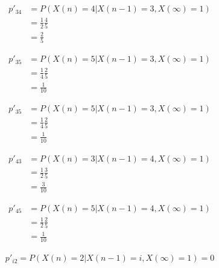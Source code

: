 \documentclass[12pt, a4paper]{article}
\begin{document}
\subsection{}

\begin{subequations}
  \begin{align}
    p'_{34} &= P(X(n)=4|X(n-1)=3,X(\infty)=1)\\
            &= \frac{1}{2}\frac{4}{5}\\
            &= \frac{2}{5}
  \end{align}
\end{subequations}

\begin{subequations}
  \begin{align}
    p'_{35} &= P(X(n)=5|X(n-1)=3,X(\infty)=1)\\
            &= \frac{1}{4}\frac{2}{5}\\
            &= \frac{1}{10}
  \end{align}
\end{subequations}

\begin{subequations}
  \begin{align}
    p'_{35} &= P(X(n)=5|X(n-1)=3,X(\infty)=1)\\
            &= \frac{1}{4}\frac{2}{5}\\
            &= \frac{1}{10}
  \end{align}
\end{subequations}

\begin{subequations}
  \begin{align}
    p'_{43} &= P(X(n)=3|X(n-1)=4,X(\infty)=1)\\
            &= \frac{1}{2}\frac{3}{5}\\
            &= \frac{3}{10}
  \end{align}
\end{subequations}

\begin{subequations}
  \begin{align}
    p'_{45} &= P(X(n)=5|X(n-1)=4,X(\infty)=1)\\
            &= \frac{1}{2}\frac{2}{5}\\
            &= \frac{1}{10}
  \end{align}
\end{subequations}



\begin{subequations}
  \begin{align}
    p'_{i2} =  P(X(n)=2|X(n-1)=i,X(\infty)=1) = 0
  \end{align}
\end{subequations}
\end{document}
